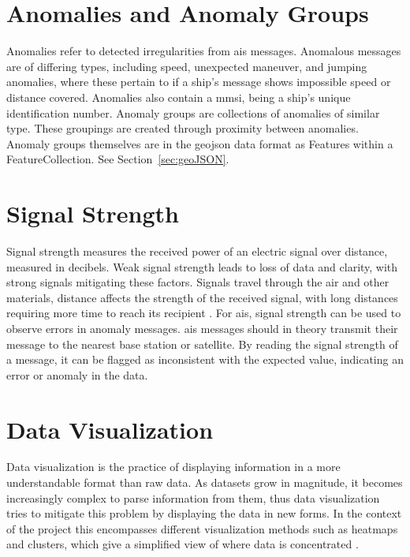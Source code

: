 \section{Anomalies and Anomaly Groups} 
\label{sec:anomalies and anomaly groups}


Anomalies refer to detected irregularities from \acrshort{ais} messages. Anomalous messages are of differing types, including speed, unexpected maneuver, and jumping anomalies, where these pertain to if a ship's message shows impossible speed or distance covered. Anomalies also contain a \acrfull{mmsi}, being a ship's unique identification number. Anomaly groups are collections of anomalies of similar type. These groupings are created through proximity between anomalies. Anomaly groups themselves are in the \acrshort{geojson} data format as Features within a FeatureCollection. See Section~\ref{sec:geoJSON}.
 
 
\section{Signal Strength}
\label{sec:signal_strength}

Signal strength measures the received power of an electric signal over distance, measured in decibels. Weak signal strength leads to loss of data and clarity, with strong signals mitigating these factors. Signals travel through the air and other materials, distance affects the strength of the received signal, with long distances requiring more time to reach its recipient \parencite{tarmac_signal_strength}. For \acrshort{ais}, signal strength can be used to observe errors in anomaly messages. \acrshort{ais} messages should in theory transmit their message to the nearest base station or satellite. By reading the signal strength of a message, it can be flagged as inconsistent with the expected value, indicating an error or anomaly in the data.
\section{Data Visualization}
\label{sec:data_visualizatoin}
\noindent Data visualization is the practice of displaying information in a more understandable format than raw data. As datasets grow in magnitude, it becomes increasingly complex to parse information from them, thus data visualization tries to mitigate this problem by displaying the data in new forms. In the context of the project this encompasses different visualization methods such as heatmaps and clusters, which give a simplified view of where data is concentrated
\parencite{what_is_data_visualization}.


